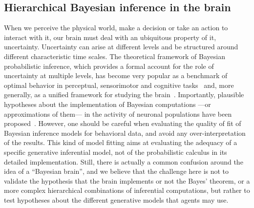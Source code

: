 \documentclass[10pt,letterpaper]{article}
\newcommand{\citep}[1]{\cite{#1}}
\newcommand{\AM}[1]{\textbf{\textcolor{blue}{[AM: #1]}}}
\begin{document}
\subsection*{Hierarchical Bayesian inference in the brain}
When we perceive the physical world, make a decision or take an action to interact with it, our brain must deal with an ubiquitous property of it, uncertainty. Uncertainty can arise at different levels and be structured around different characteristic time scales. %
The theoretical framework of Bayesian probabilistic inference, which provides a formal account for the role of uncertainty at multiple levels, %
has become very popular as a benchmark of optimal behavior in perceptual, sensorimotor and cognitive tasks~\citep{KnillPouget2004} and, more generally, as a unified framework for studying the brain~\citep{Friston2010}. Importantly, plausible hypotheses about the implementation of Bayesian computations ---or approximations of them--- in the activity of neuronal populations have been proposed~\citep{Bastos12, Fetsch2012,Ma2006}. However, one should be careful when evaluating the quality of fit of Bayesian inference models for behavioral data, and avoid any over-interpretation of the results. This kind of model fitting aims at evaluating the adequacy of a specific generative inferential model, not of the probabilistic calculus in its detailed implementation.
Still, there is actually a common confusion around the idea of a ``Bayesian brain'', and
we believe that the challenge here is not to validate the hypothesis that the brain implements or not the Bayes' theorem, or a more complex hierarchical combinations of inferential computations, but rather to test hypotheses about the different generative models
that agents may use.
\end{document}
